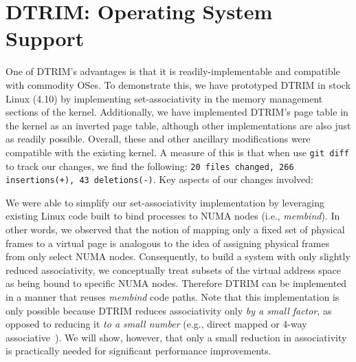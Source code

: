 \section{DTRIM: Operating System Support}
\label{sec:os}

One of DTRIM's advantages is that it is readily-implement\-able and
compatible with commodity OSes. To demonstrate this, we have
prototyped DTRIM in stock Linux (4.10) by implementing
set-associativity in the memory management sections of the
kernel. Additionally, we have implemented DTRIM's page table in the
kernel as an inverted page table, although other implementations are
also just as readily possible.  Overall, these and other ancillary
modifications were compatible with the existing kernel. A measure of
this is that when use \verb|git diff| to track our changes, we find
the following: \texttt{20 files changed, 266 insertions(+), 43
  deletions(-)}. Key aspects of our changes involved:

\vspace{2mm}
 We were
able to simplify our set-associativity implementation by leveraging
existing Linux code built to bind processes to NUMA nodes (i.e., {\it
  membind}). In other words, we observed that the notion of mapping
only a fixed set of physical frames to a virtual page is analogous to
the idea of assigning physical frames from only select NUMA
nodes. Consequently, to build a system with only slightly reduced
associativity, we conceptually treat subsets of the virtual address
space as being bound to specific NUMA nodes. Therefore DTRIM can be
implemented in a manner that reuses {\it membind} code paths. Note
that this implementation is only possible because DTRIM reduces
associativity only \textit{by a small factor}, as opposed to reducing
it \textit{to a small number} (e.g., direct mapped or 4-way
associative~\cite{picorel:near-memory}). We will show, however, that
only a small reduction in associativity is practically needed for
significant performance improvements.



